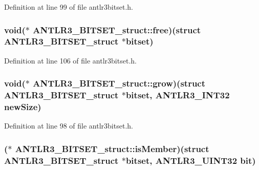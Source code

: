 Definition at line 99 of file antlr3bitset.\-h.

\hypertarget{struct_a_n_t_l_r3___b_i_t_s_e_t__struct_ab3db8527ade03bfcaccc50ba77457590}{
\subsubsection[{free}]{\setlength{\rightskip}{0pt plus 5cm}void($\ast$ A\-N\-T\-L\-R3\-\_\-\-B\-I\-T\-S\-E\-T\-\_\-struct\-::free)(struct {\bf A\-N\-T\-L\-R3\-\_\-\-B\-I\-T\-S\-E\-T\-\_\-struct} $\ast$bitset)}}\label{struct_a_n_t_l_r3___b_i_t_s_e_t__struct_ab3db8527ade03bfcaccc50ba77457590}


Definition at line 106 of file antlr3bitset.\-h.

\hypertarget{struct_a_n_t_l_r3___b_i_t_s_e_t__struct_ac960f12142d6cc806a52deccdf11db31}{
\subsubsection[{grow}]{\setlength{\rightskip}{0pt plus 5cm}void($\ast$ A\-N\-T\-L\-R3\-\_\-\-B\-I\-T\-S\-E\-T\-\_\-struct\-::grow)(struct {\bf A\-N\-T\-L\-R3\-\_\-\-B\-I\-T\-S\-E\-T\-\_\-struct} $\ast$bitset, {\bf A\-N\-T\-L\-R3\-\_\-\-I\-N\-T32} new\-Size)}}\label{struct_a_n_t_l_r3___b_i_t_s_e_t__struct_ac960f12142d6cc806a52deccdf11db31}


Definition at line 98 of file antlr3bitset.\-h.

\hypertarget{struct_a_n_t_l_r3___b_i_t_s_e_t__struct_af8176cb13102a69cd7163b7912070c44}{
\subsubsection[{is\-Member}]{($\ast$ A\-N\-T\-L\-R3\-\_\-\-B\-I\-T\-S\-E\-T\-\_\-struct\-::is\-Member)(struct {\bf A\-N\-T\-L\-R3\-\_\-\-B\-I\-T\-S\-E\-T\-\_\-struct} $\ast$bitset, {\bf A\-N\-T\-L\-R3\-\_\-\-U\-I\-N\-T32} bit)}}\label{struct_a_n_t_l_r3___b_i_t_s_e_t__struct_af8176cb13102a69cd7163b7912070c44}



